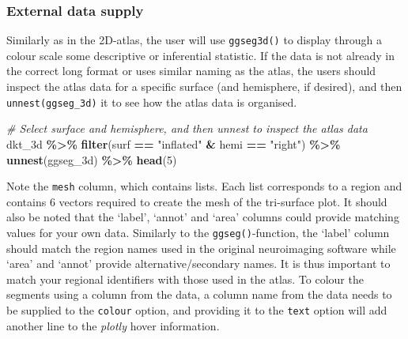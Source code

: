 \documentclass[fleqn,10pt]{wlpeerj} %
\newenvironment{Shaded}{\begin{snugshade}}{\end{snugshade}}
\newcommand{\CommentTok}[1]{\textcolor[rgb]{0.56,0.35,0.01}{\textit{#1}}}
\newcommand{\DecValTok}[1]{\textcolor[rgb]{0.00,0.00,0.81}{#1}}
\newcommand{\KeywordTok}[1]{\textcolor[rgb]{0.13,0.29,0.53}{\textbf{#1}}}
\newcommand{\NormalTok}[1]{#1}
\newcommand{\OperatorTok}[1]{\textcolor[rgb]{0.81,0.36,0.00}{\textbf{#1}}}
\newcommand{\StringTok}[1]{\textcolor[rgb]{0.31,0.60,0.02}{#1}}
\begin{document}
\normalsize

\hypertarget{external-data-supply}{%
\subsubsection{External data supply}\label{external-data-supply}}

Similarly as in the 2D-atlas, the user will use \texttt{ggseg3d()} to display through a colour scale some descriptive or inferential statistic.
If the data is not already in the correct long format or uses similar naming as the atlas, the users should inspect the atlas data for a specific surface (and hemisphere, if desired), and then \texttt{unnest(ggseg\_3d)} it to see how the atlas data is organised.

\small

\begin{Shaded}
\begin{Highlighting}[]
\CommentTok{\# Select surface and hemisphere, and then unnest to inspect the atlas data}
\NormalTok{dkt\_3d }\OperatorTok{\%>\%}
\StringTok{  }\KeywordTok{filter}\NormalTok{(surf }\OperatorTok{==}\StringTok{ "inflated"} \OperatorTok{\&}\StringTok{ }\NormalTok{hemi }\OperatorTok{==}\StringTok{ "right"}\NormalTok{) }\OperatorTok{\%>\%}
\StringTok{  }\KeywordTok{unnest}\NormalTok{(ggseg\_3d) }\OperatorTok{\%>\%}
\StringTok{  }\KeywordTok{head}\NormalTok{(}\DecValTok{5}\NormalTok{)}
\end{Highlighting}
\end{Shaded}

\normalsize

Note the \texttt{mesh} column, which contains lists.
Each list corresponds to a region and contains 6 vectors required to create the mesh of the tri-surface plot.
It should also be noted that the `label', `annot' and `area' columns could provide matching values for your own data.
Similarly to the \texttt{ggseg()}-function, the `label' column should match the region names used in the original neuroimaging software while `area' and `annot' provide alternative/secondary names.
It is thus important to match your regional identifiers with those used in the atlas.
To colour the segments using a column from the data, a column name from the data needs to be supplied to the \texttt{colour} option, and providing it to the \texttt{text} option will add another line to the \emph{plotly} hover information.
\end{document}
